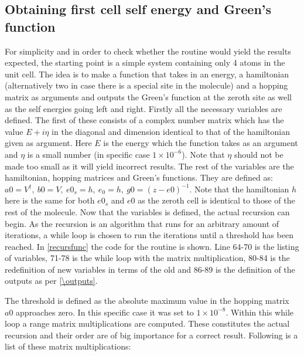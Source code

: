 \subsection{Obtaining first cell self energy and Green's function}\label{recursionroutinesec}
For simplicity and in order to check whether the routine would yield the results expected, the starting point is a simple system containing only 4 atoms in the unit cell. The idea is to make a function that takes in an energy, a hamiltonian (alternatively two in case there is a special site in the molecule) and a hopping matrix as arguments and outputs the Green's function at the zeroth site as well as the self energies going left and right. Firstly all the necessary variables are defined. The first of these consists of a complex number matrix which has the value \(E + i\eta\) in the diagonal and dimension identical to that of the hamiltonian given as argument. Here \(E\) is the energy which the function takes as an argument and \(\eta\) is a small number (in specific case \(1\times10^{-6}\)). Note that \(\eta\) should not be made too small as it will yield incorrect results. The rest of the variables are the hamiltonian, hopping matrices and Green's functions. They are defined as: \(a0 = V^{\dagger}, \ b0 = V, \ e0_{s} = h, \ e_{0} = h, \ g0 = (z-e0)^{-1}\). Note that the hamiltonian \(h\) here is the same for both \(e0_{s}\) and \(e0\) as the zeroth cell is identical to those of the rest of the molecule. Now that the variables is defined, the actual recursion can begin. As the recursion is an algorithm that runs for an arbitrary amount of iterations, a while loop is chosen to run the iterations until a threshold has been reached. In \cref{recursfunc} the code for the routine is shown. Line 64-70 is the listing of variables, 71-78 is the while loop with the matrix multiplication, 80-84 is the redefinition of new variables in terms of the old and 86-89 is the definition of the outputs as per \cref{\outputs}.\\
\noindent
\begin{listing}
    \begin{minipage}[t]{.2\textwidth}
    \end{minipage}
\end{listing}
\begin{listing}
    \begin{minipage}[t]{.2\textwidth}
    \end{minipage}
\end{listing}The threshold is defined as the absolute maximum value in the hopping matrix \(a0\) approaches zero. In this specific case it was set to \(1\times10^{-8} \). Within this while loop a range matrix multiplications are computed. These constitutes the actual recursion and their order are of big importance for a correct result. Following is a list of these matrix multiplications: 
